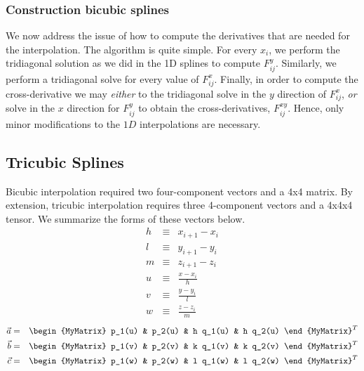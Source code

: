 \subsubsection{Construction bicubic splines}
We now address the issue of how to compute the derivatives that are
needed for the interpolation.  The algorithm is quite simple.  For
every $x_i$, we perform the tridiagonal solution as we did in the 1D
splines to compute $F^y_{ij}$.  Similarly, we perform a tridiagonal
solve for every value of $F^x_{ij}$.  Finally, in order to compute the
cross-derivative we may {\em either} to the tridiagonal solve in the $y$
direction of $F^x_{ij}$, {\em or} solve in the $x$ direction for
$F^y_{ij}$ to obtain the cross-derivatives, $F^{xy}_{ij}$.  Hence,
only minor modifications to the $1D$ interpolations are necessary.

\subsection{Tricubic Splines}
Bicubic interpolation required two four-component vectors and a 4x4
matrix.  By extension, tricubic interpolation requires three
4-component vectors and a 4x4x4 tensor.  We summarize the forms of
these vectors below.
\begin{eqnarray}
h & \equiv & x_{i+1}-x_i \\
l & \equiv & y_{i+1}-y_i \\
m & \equiv & z_{i+1}-z_i \\
u & \equiv & \frac{x-x_i}{h} \\
v & \equiv & \frac{y-y_i}{l} \\
w & \equiv & \frac{z-z_i}{m}
\end{eqnarray}
\begin{eqnarray}
\vec{a} & = & 
\begin{MyMatrix}
p_1(u) & p_2(u) & h q_1(u) & h q_2(u) 
\end{MyMatrix}^T \\
\vec{b} & = & 
\begin{MyMatrix}
p_1(v) & p_2(v) & k q_1(v) & k q_2(v) 
\end{MyMatrix}^T \\
\vec{c} & = & 
\begin{MyMatrix}
p_1(w) & p_2(w) & l q_1(w) & l q_2(w) 
\end{MyMatrix}^T 
\end{eqnarray}
